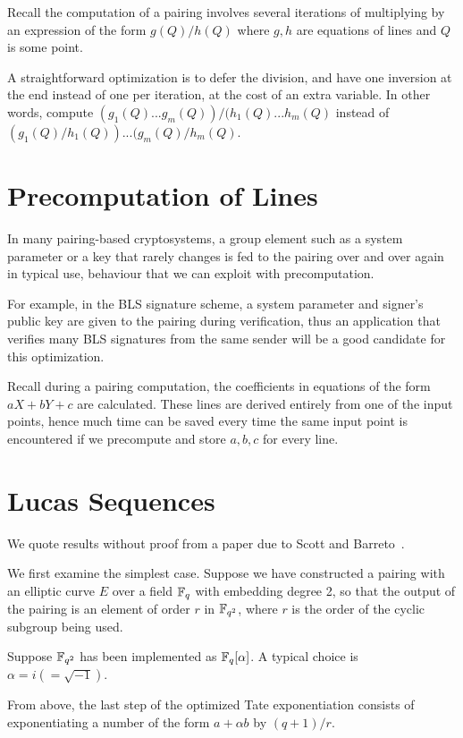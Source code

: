 Recall the computation of a pairing involves several iterations
of multiplying by an expression of the form $g(Q) / h(Q)$
where $g, h$ are equations of lines and $Q$ is some point.

A straightforward optimization is to defer the division,
and have one inversion at the end instead of one per iteration, at
the cost of an extra variable.
In other words, compute $(g_1(Q) ... g_m(Q)) / (h_1(Q) ... h_m(Q)$ instead
of $(g_1(Q) / h_1(Q)) ... (g_m(Q) / h_m(Q)$.

\section {Precomputation of Lines}

In many pairing-based cryptosystems, a group element such as a system parameter
or a key that rarely changes is fed to the pairing over and over again in
typical use, behaviour that we can exploit with precomputation.

For example, in the BLS signature scheme, a system parameter and
signer's public key are given to the pairing during verification, thus
an application that verifies many BLS signatures from the same sender will be a
good candidate for this optimization.

Recall during a pairing computation, the coefficients in equations of the form
$aX + bY + c$ are calculated. These lines
are derived entirely from one of the input points,
hence much time can be saved every time the same input point is encountered
if we precompute and store $a, b, c$ for every line.

\section {Lucas Sequences}

We quote results without proof from a paper
due to Scott and Barreto~\cite{compressedpairings}.

We first examine the simplest case.
Suppose we have constructed a pairing
with an elliptic curve $E$ over a field $\mathbb{F}_q$ with embedding degree 2,
so that the output of the pairing is an element of order $r$
in $\mathbb{F}_{q^2}$, where $r$ is the order of the cyclic subgroup being used.

Suppose $\mathbb{F}_{q^2}$ has been implemented as $\mathbb{F}_q[\alpha]$.
A typical choice is $\alpha = i (=\sqrt{-1})$.

From above, the last step of the optimized Tate exponentiation
consists of exponentiating a number of the form $a + \alpha b$ by
$(q + 1) / r$.

